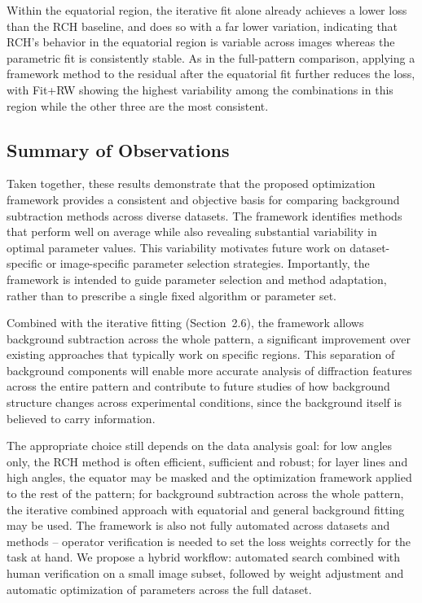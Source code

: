 \documentclass[iucr]{iucrjournals}
\begin{document}
Within the equatorial region, the iterative fit alone already achieves a lower loss than the RCH baseline, and does so with a far lower variation, indicating that RCH's behavior in the equatorial region is variable across images whereas the parametric fit is consistently stable. As in the full-pattern comparison, applying a framework method to the residual after the equatorial fit further reduces the loss, with Fit+RW showing the highest variability among the combinations in this region while the other three are the most consistent.


\subsection{Summary of Observations}

Taken together, these results demonstrate that the proposed optimization framework provides a consistent and objective basis for comparing background subtraction methods across diverse datasets. The framework identifies methods that perform well on average while also revealing substantial variability in optimal parameter values. This variability motivates future work on dataset-specific or image-specific parameter selection strategies. Importantly, the framework is intended to guide parameter selection and method adaptation, rather than to prescribe a single fixed algorithm or parameter set. 

Combined with the iterative fitting (Section~2.6), the framework allows background subtraction across the whole pattern, a significant improvement over existing approaches that typically work on specific regions. This separation of background components will enable more accurate analysis of diffraction features across the entire pattern and contribute to future studies of how background structure changes across experimental conditions, since the background itself is believed to carry information.

The appropriate choice still depends on the data analysis goal: for low angles only, the RCH method is often efficient, sufficient and robust; for layer lines and high angles, the equator may be masked and the optimization framework applied to the rest of the pattern; for background subtraction across the whole pattern, the iterative combined approach with equatorial and general background fitting may be used. The framework is also not fully automated across datasets and methods -- operator verification is needed to set the loss weights correctly for the task at hand. We propose a hybrid workflow: automated search combined with human verification on a small image subset, followed by weight adjustment and automatic optimization of parameters across the full dataset.
\end{document}
